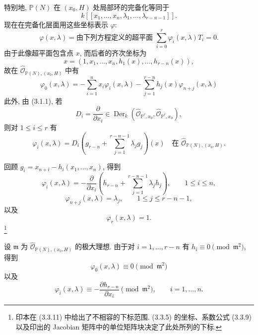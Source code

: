 特别地, $\mathbb P(N)$ 在 $(x_0,H)$ 处局部环的完备化等同于
\[
k[[x_1,\ldots,x_n,\lambda_1,\ldots,\lambda_{r-n-1}]].
\]
现在在完备化层面用这些坐标表示 $\varphi$:
\begin{equation}\tag{3.3.6}
\varphi(x,\lambda)
=\text{由下列方程定义的超平面 }
\sum_{i=0}^{r}\varphi_i(x,\lambda)T_i=0.
\end{equation}
由于此像超平面包含点 $x$, 而后者的齐次坐标为
\begin{equation}\tag{3.3.7}
x=(1,x_1,\ldots,x_n,h_1(x),\ldots,h_{r-n}(x)),
\end{equation}
故在 $\widehat{\mathcal O}_{\mathbb P(N),(x_0,H)}$ 中有
\begin{equation}\tag{3.3.8}
\varphi_0(x,\lambda)
=-\sum_{i=1}^{n}x_i\varphi_i(x,\lambda)
 -\sum_{j=1}^{r-n}h_j(x)\varphi_{n+j}(x,\lambda)
\end{equation}
此外, 由 (3.1.1), 若
\[
D_i=\frac{\partial}{\partial x_i}\in
\operatorname{Der}_k(
\widehat{\mathcal O}_{\mathbb P^r,x_0},
\widehat{\mathcal O}_{\mathbb P^r,x_0}),
\]
则对 $1\leq i\leq r$ 有
\begin{equation}\tag{3.3.9}
\varphi_i(x,\lambda)
=D_i\!\left(g_{r-n}+
\sum_{j=1}^{r-n-1}\lambda_jg_j\right)(x)
\quad\text{在 }\widehat{\mathcal O}_{\mathbb P(N),(x_0,H)}.
\end{equation}

回顾 $g_i=x_{n+i}-h_i(x_1,\ldots,x_n)$, 得到
\begin{equation}\tag{3.3.10}
\varphi_i(x,\lambda)
=-\frac{\partial}{\partial x_i}
\left(h_{r-n}+\sum_{j=1}^{r-n-1}\lambda_jh_j\right),
\qquad 1\leq i\leq n,
\end{equation}
\begin{equation}\tag{3.3.11}
\varphi_{n+j}(x,\lambda)=\lambda_j,
\qquad 1\leq j\leq r-n-1,
\end{equation}
以及
\begin{equation}\tag{3.3.12}
\varphi_r(x,\lambda)=1.
\end{equation}
\footnote{印本在 (3.3.11) 中给出了不相容的下标范围. (3.3.5) 的坐标、系数公式 (3.3.9) 以及印出的 Jacobian 矩阵中的单位矩阵块决定了此处所列的下标.}

设 $\mathfrak m$ 为 $\widehat{\mathcal O}_{\mathbb P(N),(x_0,H)}$ 的极大理想. 由于对 $i=1,\ldots,r-n$ 有 $h_i\equiv0\pmod{\mathfrak m^2}$, 得到
\begin{equation}\tag{3.3.13}
\varphi_0(x,\lambda)\equiv0\pmod{\mathfrak m^2}
\end{equation}
以及
\begin{equation}\tag{3.3.14}
\varphi_i(x,\lambda)
\equiv-\frac{\partial h_{r-n}}{\partial x_i}
\pmod{\mathfrak m^2},
\qquad i=1,\ldots,n.
\end{equation}